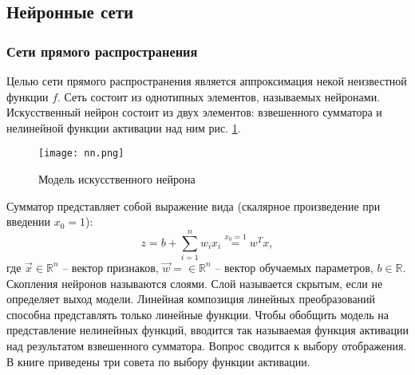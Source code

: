 \subsection{Нейронные сети}
\subsubsection{Сети прямого распространения}
\par
Целью сети прямого распространения является аппроксимация некой неизвестной функции $f$. Сеть состоит из однотипных элементов, называемых нейронами. Искусственный нейрон состоит из двух элементов: взвешенного сумматора и нелинейной функции активации над ним рис. \ref{fig:nn}.
\begin{figure}[H]
    \centering
    \texttt{[image: nn.png]}
    \caption{Модель искусственного нейрона}
    \label{fig:nn}
\end{figure}
Сумматор представляет собой выражение вида (скалярное произведение при введении $x_0 = 1$):
\[z = b + \sum\limits_{i=1}^n w_i x_i \stackrel{x_0=1}{=} w^Tx,\]
где $\vec x \in \mathbb{R}^n$ -- вектор признаков, $\vec w = \in \mathbb{R}^n$ -- вектор обучаемых параметров, $b \in \mathbb{R}$. Скопления нейронов называются слоями. Слой называется скрытым, если не определяет выход модели. Линейная композиция линейных преобразований способна представлять только линейные функции. Чтобы обобщить модель на представление нелинейных функций, вводится так называемая функция активации над результатом взвешенного сумматора. Вопрос сводится к выбору отображения. В книге \cite{Goodfellow} приведены три совета по выбору функции активации.
